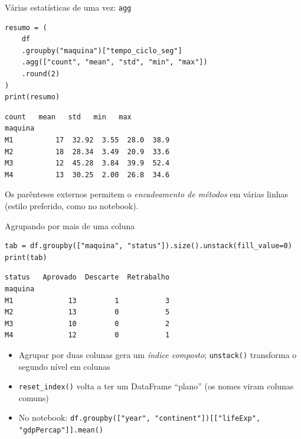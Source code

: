\documentclass[aspectratio=169,10pt,t]{beamer}
\begin{document}
\begin{frame}[fragile]{Várias estatísticas de uma vez: \texttt{agg}}
\begin{lstlisting}[basicstyle=\ttfamily\scriptsize]
resumo = (
    df
    .groupby("maquina")["tempo_ciclo_seg"]
    .agg(["count", "mean", "std", "min", "max"])
    .round(2)
)
print(resumo)
\end{lstlisting}
\begin{lstlisting}[basicstyle=\ttfamily\scriptsize,style=saida]
         count   mean   std   min   max
maquina
M1          17  32.92  3.55  28.0  38.9
M2          18  28.34  3.49  20.9  33.6
M3          12  45.28  3.84  39.9  52.4
M4          13  30.25  2.00  26.8  34.6
\end{lstlisting}
  \small Os parênteses externos permitem o \emph{encadeamento de métodos} em várias linhas (estilo preferido, como no notebook).
\end{frame}

\begin{frame}[fragile]{Agrupando por mais de uma coluna}
\begin{lstlisting}
tab = df.groupby(["maquina", "status"]).size().unstack(fill_value=0)
print(tab)
\end{lstlisting}
\begin{lstlisting}[style=saida]
status   Aprovado  Descarte  Retrabalho
maquina
M1             13         1           3
M2             13         0           5
M3             10         0           2
M4             12         0           1
\end{lstlisting}
  \begin{itemize}\small
    \item Agrupar por duas colunas gera um \emph{índice composto}; \texttt{unstack()} transforma o segundo nível em colunas
    \item \texttt{reset\_index()} volta a ter um DataFrame ``plano'' (os nomes viram colunas comuns)
    \item No notebook: \texttt{df.groupby(["year", "continent"])[["lifeExp", "gdpPercap"]].mean()}
  \end{itemize}
\end{frame}
\end{document}
